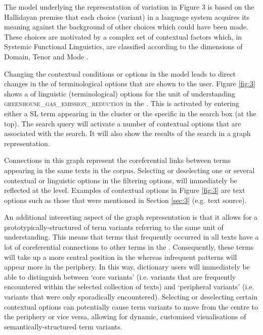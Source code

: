 \documentclass[output=paper]{langsci/langscibook.cls}
\begin{document}
The model underlying the representation of variation in Figure 3 is based on the 
Hallidayan premise that each choice (variant) in a language system acquires its 
meaning against the background of other choices which could have been made. These 
choices are motivated by a complex set of contextual factors which, in Systemic 
Functional Linguistics, are classified according to the dimensions of Domain, Tenor 
and Mode \citep{Eggins2004}.

Changing the contextual conditions or options in the model leads to direct changes 
in the  of terminological options that are shown to the user. Figure \ref{fig:3} shows 
a  of linguistic (terminological) options for the unit of understanding 
\textsc{greenhouse\_gas\_emission\_reduction} in the . This 
 is activated by entering either a SL term appearing in the cluster or the 
specific  in the search box (at the top). The search query will activate 
a number of contextual options that are associated with the search. It will also 
show the results of the search in a graph representation. 

Connections in this graph represent the coreferential links between terms appearing 
in the same texts in the corpus. Selecting or deselecting one or several contextual 
or linguistic options in the filtering options, will immediately be reflected at 
the  level. Examples of contextual options in Figure \ref{fig:3} are text options 
such as those that were mentioned in Section \ref{sec:3} (e.g. text source).

An additional interesting aspect of the graph representation is that it allows 
for a prototypically-structured  of term variants referring to the 
same unit of understanding. This means that terms that frequently occurred in all 
texts have a lot of coreferential connections to other terms in the . Consequently, 
these terms will take up a more central position in the  whereas infrequent 
patterns will appear more in the periphery. In this way, dictionary users will 
immediately be able to distinguish between `core variants' (i.e. variants that 
are frequently encountered within the selected collection of texts) and `peripheral 
variants' (i.e. variants that were only sporadically encountered). Selecting or 
deselecting certain contextual options can potentially cause term variants to move 
from the centre to the periphery or vice versa, allowing for dynamic, customised 
visualisations of semantically-structured term variants.
\end{document}
